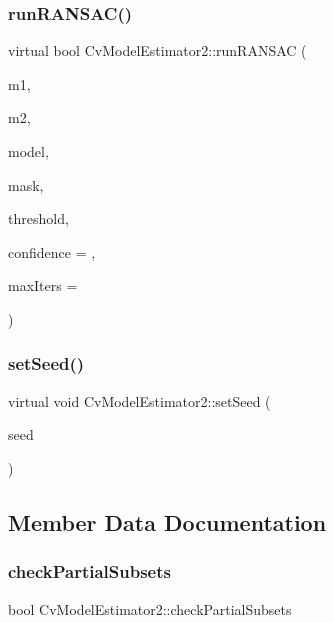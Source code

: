 \subsubsection{\texorpdfstring{run\+R\+A\+N\+S\+A\+C()}{runRANSAC()}}
{\footnotesize\ttfamily virtual bool Cv\+Model\+Estimator2\+::run\+R\+A\+N\+S\+AC (\begin{DoxyParamCaption}\item[{const Cv\+Mat $\ast$}]{m1,  }\item[{const Cv\+Mat $\ast$}]{m2,  }\item[{Cv\+Mat $\ast$}]{model,  }\item[{Cv\+Mat $\ast$}]{mask,  }\item[{double}]{threshold,  }\item[{double}]{confidence = {},  }\item[{int}]{max\+Iters = {} }\end{DoxyParamCaption})\hspace{0.3cm}{\ttfamily [virtual]}}

\mbox{\label{class_cv_model_estimator2_a4946fc6c99f37e5dae1f68e78e85110d}} 
\subsubsection{\texorpdfstring{set\+Seed()}{setSeed()}}
{\footnotesize\ttfamily virtual void Cv\+Model\+Estimator2\+::set\+Seed (\begin{DoxyParamCaption}\item[{int64}]{seed }\end{DoxyParamCaption})\hspace{0.3cm}{\ttfamily [virtual]}}



\subsection{Member Data Documentation}
\mbox{\label{class_cv_model_estimator2_a579cf07784af6c3710ab23aa841cb7d5}} 
\subsubsection{\texorpdfstring{check\+Partial\+Subsets}{checkPartialSubsets}}
{\footnotesize\ttfamily bool Cv\+Model\+Estimator2\+::check\+Partial\+Subsets\hspace{0.3cm}{\ttfamily [protected]}}



